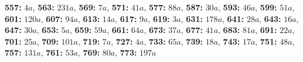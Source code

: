\textsf{\bfseries 557:} $4a$, \textsf{\bfseries 563:} $231a$, \textsf{\bfseries 569:} $7a$, \textsf{\bfseries 571:} $41a$, \textsf{\bfseries 577:} $88a$, \textsf{\bfseries 587:} $30a$, \textsf{\bfseries 593:} $46a$, \textsf{\bfseries 599:} $51a$, \textsf{\bfseries 601:} $120a$, \textsf{\bfseries 607:} $94a$, \textsf{\bfseries 613:} $14a$, \textsf{\bfseries 617:} $9a$, \textsf{\bfseries 619:} $3a$, \textsf{\bfseries 631:} $178a$, \textsf{\bfseries 641:} $28a$, \textsf{\bfseries 643:} $16a$, \textsf{\bfseries 647:} $30a$, \textsf{\bfseries 653:} $5a$, \textsf{\bfseries 659:} $59a$, \textsf{\bfseries 661:} $64a$, \textsf{\bfseries 673:} $37a$, \textsf{\bfseries 677:} $41a$, \textsf{\bfseries 683:} $81a$, \textsf{\bfseries 691:} $22a$, \textsf{\bfseries 701:} $25a$, \textsf{\bfseries 709:} $101a$, \textsf{\bfseries 719:} $7a$, \textsf{\bfseries 727:} $4a$, \textsf{\bfseries 733:} $65a$, \textsf{\bfseries 739:} $18a$, \textsf{\bfseries 743:} $17a$, \textsf{\bfseries 751:} $48a$, \textsf{\bfseries 757:} $131a$, \textsf{\bfseries 761:} $53a$, \textsf{\bfseries 769:} $80a$, \textsf{\bfseries 773:} $197a$